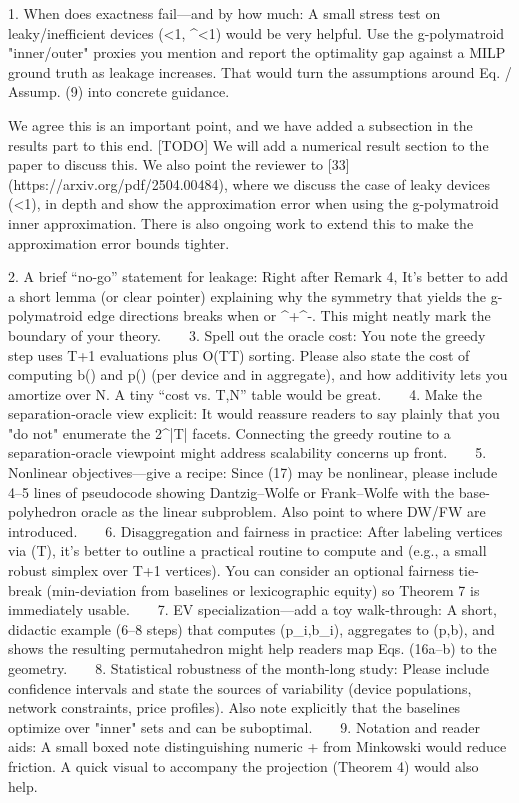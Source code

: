 1. When does exactness fail—and by how much: A small stress test on leaky/inefficient devices (\lambda<1, \eta^\pm<1) would be very helpful. Use the g-polymatroid "inner/outer" proxies you mention and report the optimality gap against a MILP ground truth as leakage increases. That would turn the assumptions around Eq. / Assump. (9) into concrete guidance.

We agree this is an important point, and we have added a subsection in the results part to this end. 
[TODO] We will add a numerical result section to the paper to discuss this.
We also point the reviewer to [33] (https://arxiv.org/pdf/2504.00484), where we discuss the case of leaky devices (\lambda<1), in depth and show the approximation error when using the g-polymatroid inner approximation.
There is also ongoing work to extend this to make the approximation error bounds tighter.

2. A brief “no-go” statement for leakage: Right after Remark 4, It's better to add a short lemma (or clear pointer) explaining why the symmetry that yields the g-polymatroid edge directions breaks when \lambda{} or \eta^+\neq\eta^-. This might neatly mark the boundary of your theory.
   
3. Spell out the oracle cost: You note the greedy step uses T{+}1 evaluations plus O(T\log T) sorting. Please also state the cost of computing b(\cdot) and p(\cdot) (per device and in aggregate), and how additivity lets you amortize over N. A tiny “cost vs. T,N” table would be great.
   
4. Make the separation-oracle view explicit: It would reassure readers to say plainly that you "do not" enumerate the 2^{|T|} facets. Connecting the greedy routine to a separation-oracle viewpoint might address scalability concerns up front.
   
5. Nonlinear objectives—give a recipe: Since (17) may be nonlinear, please include 4–5 lines of pseudocode showing Dantzig–Wolfe or Frank–Wolfe with the base-polyhedron oracle as the linear subproblem. Also point to where DW/FW are introduced.
   
6. Disaggregation and fairness in practice: After labeling vertices via (\tilde T), it's better to outline a practical routine to compute \lambda and \Pi (e.g., a small robust simplex over T{+}1 vertices). You can consider an optional fairness tie-break (min-deviation from baselines or lexicographic equity) so Theorem 7 is immediately usable.
   
7. EV specialization—add a toy walk-through: A short, didactic example (6–8 steps) that computes (p_i,b_i), aggregates to (p,b), and shows the resulting permutahedron might help readers map Eqs. (16a–b) to the geometry.
   
8. Statistical robustness of the month-long study: Please include confidence intervals and state the sources of variability (device populations, network constraints, price profiles). Also note explicitly that the baselines optimize over "inner" sets and can be suboptimal.
   
9. Notation and reader aids: A small boxed note distinguishing numeric + from Minkowski \oplus would reduce friction. A quick visual to accompany the projection (Theorem 4) would also help.

